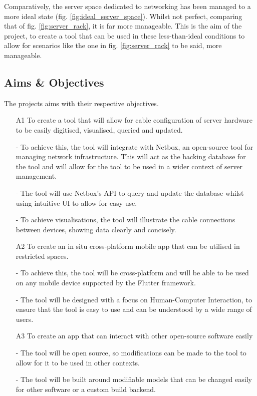 \documentclass [11pt,a4paper]{article}
\begin{document}
Comparatively, the server space dedicated to networking has been managed to a more ideal state (fig. \ref{fig:ideal_server_space}). Whilst not perfect, comparing that of fig. \ref{fig:server_rack}, it is far more manageable. This is the aim of the project, to create a tool that can be used in these less-than-ideal conditions to allow for scenarios like the one in fig. \ref{fig:server_rack} to be said, more manageable.

\subsection{Aims \& Objectives}
\label{sec:objectives}
The projects aims with their respective objectives.
\begin{enumerate} 
    

    \item[A1] To create a tool that will allow for cable configuration of server hardware to be
    easily digitised, visualised, queried and updated. 
        
    - To achieve this, the tool will integrate with Netbox, an open-source tool for managing network infrastructure. This will act as the backing database for the tool and will allow for the tool to be used in a wider context of server management.

        - The tool will use Netbox's API to query and update the database whilst using intuitive UI to allow for easy use.
        
        - To achieve visualisations, the tool will illustrate the cable connections between devices, showing data clearly and concisely.
        \pagebreak
    \item[A2] To create an in situ cross-platform mobile app that can be utilised in restricted
    spaces.    

    - To achieve this, the tool will be cross-platform and will be able to be used on any mobile device supported by the Flutter framework.
    
    - The tool will be designed with a focus on Human-Computer Interaction, to ensure that the tool is easy to use and can be understood by a wide range of users.

    \item[A3] To create an app that can interact with other open-source software easily
    
        - The tool will be open source, so modifications can be made to the tool to allow for it to be used in other contexts.
        
        - The tool will be built around modifiable models that can be changed easily for other software or a custom build backend.

\end{enumerate}
\end{document}
